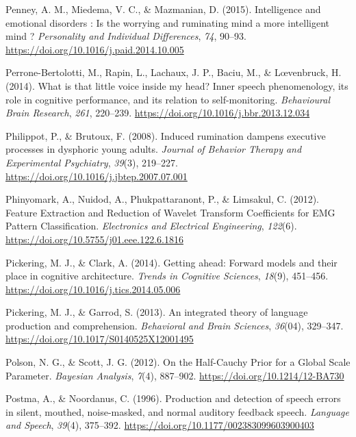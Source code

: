 \documentclass[a4paper,12pt,twoside,openright,oldfontcommands,final]{memoir}
\begin{document}
\leavevmode\hypertarget{ref-Penney2015}{}%
Penney, A. M., Miedema, V. C., \& Mazmanian, D. (2015). Intelligence and emotional disorders : Is the worrying and ruminating mind a more intelligent mind ? \emph{Personality and Individual Differences}, \emph{74}, 90--93. \url{https://doi.org/10.1016/j.paid.2014.10.005}

\leavevmode\hypertarget{ref-Perrone-Bertolotti2014}{}%
Perrone-Bertolotti, M., Rapin, L., Lachaux, J. P., Baciu, M., \& Lœvenbruck, H. (2014). What is that little voice inside my head? Inner speech phenomenology, its role in cognitive performance, and its relation to self-monitoring. \emph{Behavioural Brain Research}, \emph{261}, 220--239. \url{https://doi.org/10.1016/j.bbr.2013.12.034}

\leavevmode\hypertarget{ref-Philippot2008}{}%
Philippot, P., \& Brutoux, F. (2008). Induced rumination dampens executive processes in dysphoric young adults. \emph{Journal of Behavior Therapy and Experimental Psychiatry}, \emph{39}(3), 219--227. \url{https://doi.org/10.1016/j.jbtep.2007.07.001}

\leavevmode\hypertarget{ref-phinyomark_feature_2012}{}%
Phinyomark, A., Nuidod, A., Phukpattaranont, P., \& Limsakul, C. (2012). Feature Extraction and Reduction of Wavelet Transform Coefficients for EMG Pattern Classification. \emph{Electronics and Electrical Engineering}, \emph{122}(6). \url{https://doi.org/10.5755/j01.eee.122.6.1816}

\leavevmode\hypertarget{ref-pickering_getting_2014}{}%
Pickering, M. J., \& Clark, A. (2014). Getting ahead: Forward models and their place in cognitive architecture. \emph{Trends in Cognitive Sciences}, \emph{18}(9), 451--456. \url{https://doi.org/10.1016/j.tics.2014.05.006}

\leavevmode\hypertarget{ref-pickering_integrated_2013}{}%
Pickering, M. J., \& Garrod, S. (2013). An integrated theory of language production and comprehension. \emph{Behavioral and Brain Sciences}, \emph{36}(04), 329--347. \url{https://doi.org/10.1017/S0140525X12001495}

\leavevmode\hypertarget{ref-polson_half-cauchy_2012}{}%
Polson, N. G., \& Scott, J. G. (2012). On the Half-Cauchy Prior for a Global Scale Parameter. \emph{Bayesian Analysis}, \emph{7}(4), 887--902. \url{https://doi.org/10.1214/12-BA730}

\leavevmode\hypertarget{ref-postma_production_1996}{}%
Postma, A., \& Noordanus, C. (1996). Production and detection of speech errors in silent, mouthed, noise-masked, and normal auditory feedback speech. \emph{Language and Speech}, \emph{39}(4), 375--392. \url{https://doi.org/10.1177/002383099603900403}
\end{document}
